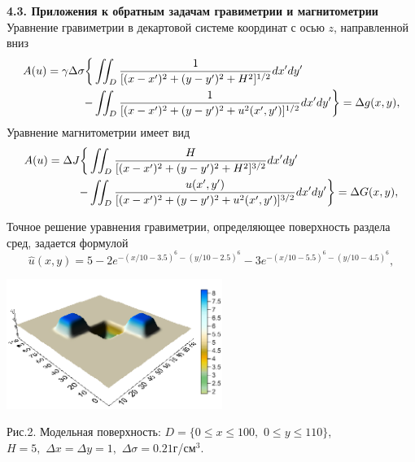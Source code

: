 \documentclass[10pt,pdf, mathserif, hyperref={unicode}]{beamer}
\begin{document}
\begin{frame}{\small\textbf{4.3. Приложения к обратным задачам гравиметрии и магнитометрии}}
	Уравнение гравиметрии в декартовой системе координат с осью $z$, направленной вниз 
	\begin{equation*}
	\begin{aligned}
	A(u)=\gamma\Delta\sigma \bigg\{ &\iint_{D} \frac{1}{[(x-x')^2+(y-y')^2+H^2]^{1/2}}dx'dy' \notag\\
	- &\iint_{D} \frac{1}{[(x-x')^2+(y-y')^2+u^2(x',y')]^{1/2}}dx'dy'\bigg\}=\Delta g(x,y),
	\end{aligned} 
	\end{equation*}
	Уравнение магнитометрии имеет вид
	\begin{equation*}\begin{aligned}
	A(u)=\Delta J  \bigg\{&\iint_{D} \frac{H}{[(x-x')^2+(y-y')^2+H^2]^{3/2}}dx'dy' \notag\\
	- &\iint_{D} \frac{u(x',y')}{[(x-x')^2+(y-y')^2+u^2(x',y')]^{3/2}}dx'dy' \bigg\}=\Delta G(x,y),
	\end{aligned} \end{equation*}
\end{frame}
\begin{frame}
	Точное решение уравнения гравиметрии, определяющее поверхность раздела сред, задается формулой %
	\begin{equation*}
	\hat{u}(x,y)=5-2e^{-(x/10-3.5)^6-(y/10-2.5)^6}-3e^{-(x/10-5.5)^6-(y/10-4.5)^6},
	\end{equation*}
	\begin{center}
		
		\includegraphics[width=7cm, height=4 cm]{Gravy_exact.png}            %
	\end{center}
	
	\begin{center}
		Рис.2. Модельная поверхность: $D=\{0\le x\le 100, \,\,0\le y\le 110\}$, \\ $  H=5,\,\,\Delta x=\Delta y=1,\,\,\Delta\sigma=0.21$г/см$^3$.
	\end{center}
\end{frame}
\end{document}
